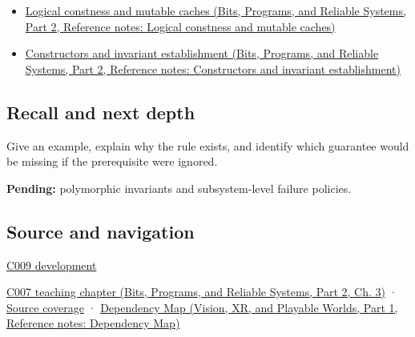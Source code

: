 \hypertarget{appendix-8e5214819615-used-by}{}

\begin{itemize}
\tightlist
\item
  \href{../01-Bits-Programs-and-Reliable-Systems-P02/main.pdf\#nameddest=appendix-f5593256bcaf}{Logical constness and mutable caches (Bits, Programs, and Reliable Systems, Part 2, Reference notes: Logical constness and mutable caches)}
\item
  \href{../01-Bits-Programs-and-Reliable-Systems-P02/main.pdf\#nameddest=appendix-7f8ec83d0886}{Constructors and invariant establishment (Bits, Programs, and Reliable Systems, Part 2, Reference notes: Constructors and invariant establishment)}
\end{itemize}

\subsection{Recall and next depth}\label{appendix-8e5214819615-recall-and-next-depth}

\hypertarget{appendix-8e5214819615-recall-and-next-depth}{}

Give an example, explain why the rule exists, and identify which guarantee would be missing if the prerequisite were ignored.

\textbf{Pending:} polymorphic invariants and subsystem-level failure policies.

\subsection{Source and navigation}\label{appendix-8e5214819615-source-and-navigation}

\hypertarget{appendix-8e5214819615-source-and-navigation}{}

\hyperref[appendix-fd090d982a15-m009---parts-127-147]{C009 development}

\href{../01-Bits-Programs-and-Reliable-Systems-P02/main.pdf\#nameddest=01-foundations-i-ch003-public-records-and-protected-invariants}{C007 teaching chapter (Bits, Programs, and Reliable Systems, Part 2, Ch. 3)} · \hyperref[appendix-fd090d982a15-m007---parts-101-112]{Source coverage} · \href{../07-Vision-XR-and-Playable-Worlds-P01/main.pdf\#nameddest=appendix-4ad47bdd269a}{Dependency Map (Vision, XR, and Playable Worlds, Part 1, Reference notes: Dependency Map)}
